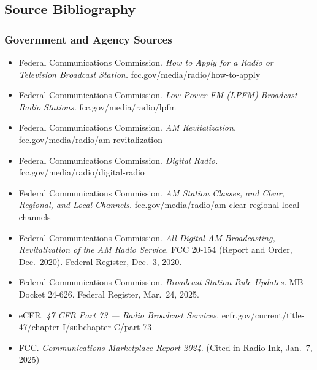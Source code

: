\documentclass[11pt,letterpaper]{article}
\begin{document}
\begin{asciibox}
\subsection{Source Bibliography}

\subsubsection{Government and Agency Sources}
\begin{itemize}[leftmargin=*]
  \item Federal Communications Commission. \textit{How to Apply for a Radio or Television Broadcast Station.} fcc.gov/media/radio/how-to-apply
  \item Federal Communications Commission. \textit{Low Power FM (LPFM) Broadcast Radio Stations.} fcc.gov/media/radio/lpfm
  \item Federal Communications Commission. \textit{AM Revitalization.} fcc.gov/media/radio/am-revitalization
  \item Federal Communications Commission. \textit{Digital Radio.} fcc.gov/media/radio/digital-radio
  \item Federal Communications Commission. \textit{AM Station Classes, and Clear, Regional, and Local Channels.} fcc.gov/media/radio/am-clear-regional-local-channels
  \item Federal Communications Commission. \textit{All-Digital AM Broadcasting, Revitalization of the AM Radio Service.} FCC 20-154 (Report and Order, Dec.\ 2020). Federal Register, Dec.\ 3, 2020.
  \item Federal Communications Commission. \textit{Broadcast Station Rule Updates.} MB Docket 24-626. Federal Register, Mar.\ 24, 2025.
  \item eCFR. \textit{47 CFR Part 73 --- Radio Broadcast Services.} ecfr.gov/current/title-47/chapter-I/subchapter-C/part-73
  \item FCC. \textit{Communications Marketplace Report 2024.} (Cited in Radio Ink, Jan.\ 7, 2025)
\end{itemize}


\end{asciibox}
\end{document}
